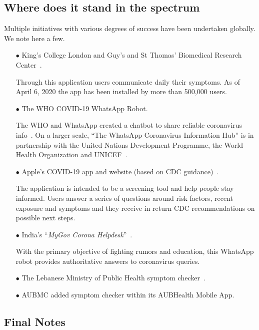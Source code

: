 \documentclass[12pt, a4paper]{article}
\begin{document}
\subsection*{Where does it stand in the spectrum}

Multiple initiatives with various degrees of success have been
undertaken globally. We note here a few.

\begin{itemize}
\item[$\bullet$] King’s College London and Guy’s and St Thomas’
  Biomedical Research Center~\cite{Kings}.

  Through this application users communicate daily their symptoms. As
  of April 6, 2020 the app has been installed by more than 500,000
  users.

\item[$\bullet$] The WHO COVID-19 WhatsApp Robot.

  The WHO and WhatsApp created a chatbot to share reliable coronavirus
  info~\cite{WHOWA}. On a larger scale, ``The WhatsApp Coronavirus
  Information Hub'' is in partnership with the United Nations
  Development Programme, the World Health Organization and
  UNICEF~\cite{WHOWAI}.
  
\item[$\bullet$] Apple's COVID-19 app and website (based on CDC
  guidance)~\cite{Apple}.

  The application is intended to be a screening tool and help people
  stay informed. Users answer a series of questions around risk
  factors, recent exposure and symptoms and they receive in return CDC
  recommendations on possible next steps.

\item[$\bullet$] India's ``{\em MyGov Corona
    Helpdesk\/}''~\cite{India}.

  With the primary objective of fighting rumors and education, this
  WhatsApp robot provides authoritative answers to coronavirus queries.
  
  
\item[$\bullet$] The Lebanese Ministry of Public Health symptom
  checker~\cite{MoPH}.
  
\item[$\bullet$] AUBMC added symptom checker within its AUBHealth
  Mobile App.

\end{itemize}


\subsection*{Final Notes}
\end{document}
